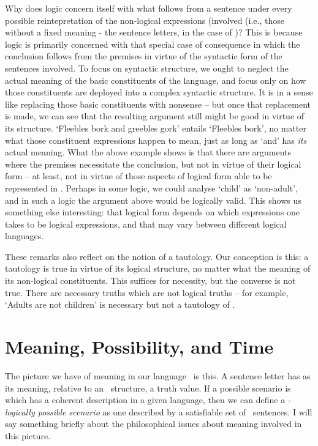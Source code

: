 Why does logic concern itself with what follows from a sentence under every possible reintepretation of the non-logical expressions (involved (i.e., those without a fixed meaning - the sentence letters, in the case of \lone)? This is because logic is primarily concerned with that special case of consequence in which the conclusion follows from the premises in virtue of the syntactic form of the sentences involved. To focus on syntactic structure, we ought to neglect the actual meaning of the basic constituents of the language, and focus only on how those constituents are deployed into a complex syntactic structure. It is in a sense like replacing those basic constituents with nonsense – but once that replacement is made, we can see that the resulting argument still might be good in virtue of its structure. `Fleebles bork and greebles gork' entails `Fleebles bork', no matter what those constituent expressions happen to mean, just as long as `and' has \emph{its} actual meaning. What the above example shows is that there are arguments where the premises necessitate the conclusion, but not in virtue of their logical form – at least, not in virtue of those aspects of logical form able to be represented in \lone. Perhaps in some logic, we could analyse `child' as `non-adult', and in such a logic the argument above would be logically valid. This shows us something else interesting: that logical form depends on which expressions one takes to be logical expressions, and that may vary between different logical languages.

These remarks also reflect on the notion of a tautology. Our conception is this: a tautology is true in virtue of its logical structure, no matter what the meaning of its non-logical constituents. This suffices for necessity, but the converse is not true. There are necessary truths which are not logical truths – for example, `Adults are not children' is necessary but not a tautology of \lone.

\section{Meaning, Possibility, and Time} The picture we have of meaning in our language \lone\ is this. A sentence letter has as its meaning, relative to an \lone\ structure, a truth value. If a possible scenario is which has a coherent description in a given language, then we can define a \emph{\lone-logically possible scenario} as one described by a satisfiable set of \lone\ sentences. I will say something briefly about the philosophical issues about meaning involved in this picture.

